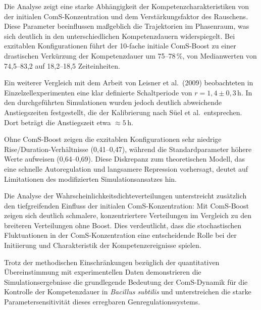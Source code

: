 \documentclass[11pt]{article}
\begin{document}
Die Analyse zeigt eine starke Abhängigkeit der Kompetenzcharakteristiken von der initialen ComS-Konzentration und dem Verstärkungsfaktor des Rauschens. Diese Parameter beeinflussen maßgeblich die Trajektorien im Phasenraum, was sich deutlich in den unterschiedlichen Kompetenzdauern widerspiegelt. Bei exzitablen Konfigurationen führt der 10-fache initiale ComS-Boost zu einer drastischen Verkürzung der Kompetenzdauer um 75--78\,\%, von Medianwerten von 74{,}5--83{,}2 auf 18{,}2--18{,}5 Zeiteinheiten.

Ein weiterer Vergleich mit dem Arbeit von Leisner et al.\ (2009) \cite{leisner2009} beobachteten in Einzelzellexperimenten eine klar definierte Schaltperiode von \( r = 1{,}4 \pm 0{,}3 \,\text{h} \). In den durchgeführten Simulationen wurden jedoch deutlich abweichende Anstiegszeiten festgestellt, die der Kalibrierung nach Süel et al.\ entsprechen. Dort beträgt die Anstiegszeit etwa \( \approx 5\,\text{h} \).

Ohne ComS-Boost zeigen die exzitablen Konfigurationen sehr niedrige Rise/Duration-Verhältnisse (0{,}41--0{,}47), während die Standardparameter höhere Werte aufweisen (0{,}64--0{,}69). Diese Diskrepanz zum theoretischen Modell, das eine schnelle Autoregulation und langsamere Repression vorhersagt, deutet auf Limitationen des modifizierten Simulationsansatzes hin.

Die Analyse der Wahrscheinlichkeitsdichteverteilungen unterstreicht zusätzlich den tiefgreifenden Einfluss der initialen ComS-Konzentration: Mit ComS-Boost zeigen sich deutlich schmalere, konzentriertere Verteilungen im Vergleich zu den breiteren Verteilungen ohne Boost. Dies verdeutlicht, dass die stochastischen Fluktuationen in der ComS-Konzentration eine entscheidende Rolle bei der Initiierung und Charakteristik der Kompetenzereignisse spielen.

Trotz der methodischen Einschränkungen bezüglich der quantitativen Übereinstimmung mit experimentellen Daten demonstrieren die Simulationsergebnisse die grundlegende Bedeutung der ComS-Dynamik für die Kontrolle der Kompetenzdauer in \textit{Bacillus subtilis} und unterstreichen die starke Parametersensitivität dieses erregbaren Genregulationssystems.


\end{document}
